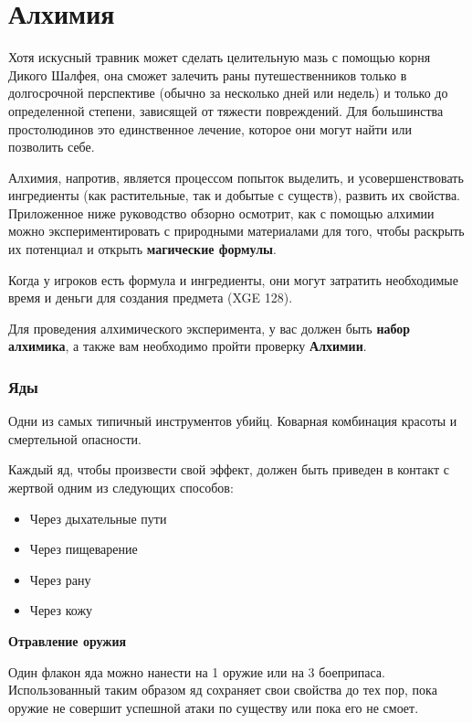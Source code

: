\documentclass[a4paper, 9pt, twocolumn]{book}
\newenvironment {dndtable}
{
		\bigskip
		\centering
		\begin{tcolorbox}
			[enhanced, 
			sharp corners,
			colback=framecolor, 
			boxrule = 0pt, 
			overlay={
				\begin{tcbinvclipframe}
					\path[fill=black] ([xshift=10pt,yshift=7pt]frame.north west) --
					(frame.north west) --
					(frame.north east) --
					([xshift=-10pt, yshift=7pt]frame.north east) --
					([xshift=-10pt, yshift=2pt]frame.north east) --
					([xshift=10pt,yshift=2pt]frame.north west) -- cycle;
					
					\path[fill=black] ([xshift=10pt,yshift=-7pt]frame.south west) --
					(frame.south west) --
					(frame.south east) --
					([xshift=-10pt, yshift=-7pt]frame.south east) --
					([xshift=-10pt, yshift=-2pt]frame.south east) --
					([xshift=10pt,yshift=-2pt]frame.south west) -- cycle;
				\end{tcbinvclipframe}
			}
			]}
{\end{tcolorbox}}
\begin{document}
	\twocolumn
	\chapter{Алхимия}
	
	Хотя искусный травник может сделать целительную мазь с помощью корня Дикого Шалфея, она сможет залечить раны путешественников только в долгосрочной перспективе (обычно за несколько дней или недель) и только до определенной степени, зависящей от тяжести повреждений. Для большинства простолюдинов это единственное лечение, которое они могут найти или позволить себе.
	
	Алхимия, напротив, является процессом попыток выделить, и усовершенствовать ингредиенты (как растительные, так и добытые с существ), развить их свойства. Приложенное ниже руководство обзорно осмотрит, как с помощью алхимии можно экспериментировать с природными материалами для того, чтобы раскрыть их потенциал и открыть \textbf{магические формулы}.
	
	Когда у игроков есть формула и ингредиенты, они могут затратить необходимые время и деньги для создания предмета (XGE 128).
	
	Для проведения алхимического эксперимента, у вас должен быть \textbf{набор алхимика}, а также вам необходимо пройти проверку \textbf{Алхимии}.
	
	\subsection{Яды}
	
	Одни из самых типичный инструментов убийц. Коварная комбинация красоты и смертельной опасности.
	
	Каждый яд, чтобы произвести свой эффект, должен быть приведен в контакт с жертвой одним из следующих способов:
	
	\begin{itemize}
		\item Через дыхательные пути
		
		\item Через пищеварение
		
		\item Через рану
		
		\item Через кожу
	\end{itemize}
	
	\begin{dndtable}
		
		{\Large \textbf{Отравление оружия}}
		
		Один флакон яда можно нанести на 1 оружие или на 3 боеприпаса. Использованный таким образом яд сохраняет свои свойства до тех пор, пока оружие не совершит успешной атаки по существу или пока его не смоет.
		
	\end{dndtable}
	
\end{document}

